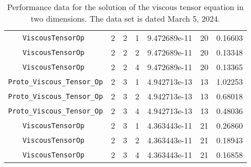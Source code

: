 \documentclass{article}
\begin{document}
\begin{small}
\begin{table}
\begin{center}
\begin{tabular}{|c|c|c|c|c|c||c|}
\hline                                                                            
 {\tt ViscousTensorOp   }              & 2 & 2 & 1   & 9.472689e-11   &  20     & 0.16603    \\
 {\tt ViscousTensorOp   }              & 2 & 2 & 2   & 9.472689e-11   &  20     & 0.13348    \\
 {\tt ViscousTensorOp   }              & 2 & 2 & 4   & 9.472689e-11   &  20     & 0.13365    \\
\hline
 {\tt Proto\_Viscous\_Tensor\_Op}      & 2 & 3 & 1   & 4.942713e-13   &  13     & 1.02253    \\
 {\tt Proto\_Viscous\_Tensor\_Op}      & 2 & 3 & 2   & 4.942713e-13   &  13     & 0.68018    \\
 {\tt Proto\_Viscous\_Tensor\_Op}      & 2 & 3 & 4   & 4.942713e-13   &  13     & 0.48036    \\
\hline                                                                           
 {\tt ViscousTensorOp   }              & 2 & 3 & 1   & 4.363443e-11   &  21     & 0.26860    \\
 {\tt ViscousTensorOp   }              & 2 & 3 & 2   & 4.363443e-11   &  21     & 0.18943    \\
 {\tt ViscousTensorOp   }              & 2 & 3 & 4   & 4.363443e-11   &  21     & 0.16858    \\
 \hline
\end{tabular}
\end{center}
\label{tab::7}
\caption
    {
      Performance data for the solution of the viscous tensor
      equation in two dimensions.    
      The data set is dated March 5, 2024.
    }
\end{table}
\end{small}
\end{document}
